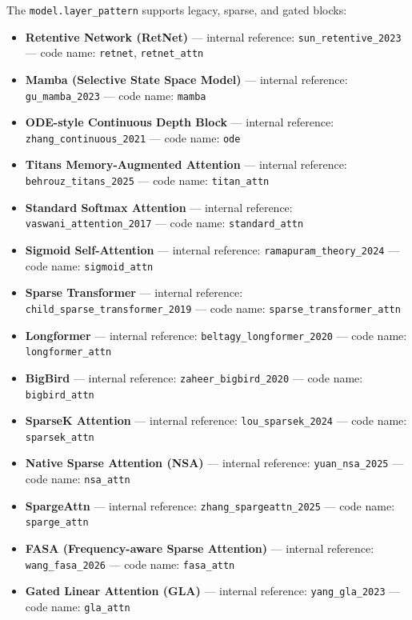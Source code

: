 The \texttt{model.layer\_pattern} supports legacy, sparse, and gated blocks:
\begin{itemize}[leftmargin=*]
    \item \textbf{Retentive Network (RetNet)} --- internal reference: \texttt{sun\_retentive\_2023} --- code name: \texttt{retnet}, \texttt{retnet\_attn}
    \item \textbf{Mamba (Selective State Space Model)} --- internal reference: \texttt{gu\_mamba\_2023} --- code name: \texttt{mamba}
    \item \textbf{ODE-style Continuous Depth Block} --- internal reference: \texttt{zhang\_continuous\_2021} --- code name: \texttt{ode}
    \item \textbf{Titans Memory-Augmented Attention} --- internal reference: \texttt{behrouz\_titans\_2025} --- code name: \texttt{titan\_attn}
    \item \textbf{Standard Softmax Attention} --- internal reference: \texttt{vaswani\_attention\_2017} --- code name: \texttt{standard\_attn}
    \item \textbf{Sigmoid Self-Attention} --- internal reference: \texttt{ramapuram\_theory\_2024} --- code name: \texttt{sigmoid\_attn}
    \item \textbf{Sparse Transformer} --- internal reference: \texttt{child\_sparse\_transformer\_2019} --- code name: \texttt{sparse\_transformer\_attn}
    \item \textbf{Longformer} --- internal reference: \texttt{beltagy\_longformer\_2020} --- code name: \texttt{longformer\_attn}
    \item \textbf{BigBird} --- internal reference: \texttt{zaheer\_bigbird\_2020} --- code name: \texttt{bigbird\_attn}
    \item \textbf{SparseK Attention} --- internal reference: \texttt{lou\_sparsek\_2024} --- code name: \texttt{sparsek\_attn}
    \item \textbf{Native Sparse Attention (NSA)} --- internal reference: \texttt{yuan\_nsa\_2025} --- code name: \texttt{nsa\_attn}
    \item \textbf{SpargeAttn} --- internal reference: \texttt{zhang\_spargeattn\_2025} --- code name: \texttt{sparge\_attn}
    \item \textbf{FASA (Frequency-aware Sparse Attention)} --- internal reference: \texttt{wang\_fasa\_2026} --- code name: \texttt{fasa\_attn}
    \item \textbf{Gated Linear Attention (GLA)} --- internal reference: \texttt{yang\_gla\_2023} --- code name: \texttt{gla\_attn}

\end{itemize}
